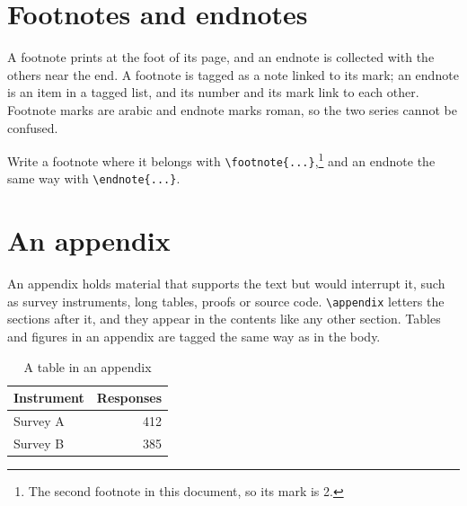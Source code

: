 \documentclass[12pt]{article}
\begin{document}
\section{Footnotes and endnotes}
A footnote prints at the foot of its page, and an endnote is collected with
the others near the end. A footnote is tagged as a note linked to its mark; an
endnote is an item in a tagged list, and its number and its mark link to each
other. Footnote marks are arabic and endnote marks roman, so the two series
cannot be confused.

Write a footnote where it belongs with \verb|\footnote{...}|,\footnote{The
second footnote in this document, so its mark is 2.} and an endnote the same
way with \verb|\endnote{...}|.

\appendix
\section{An appendix}
\label{app:example}
An appendix holds material that supports the text but would interrupt it, such
as survey instruments, long tables, proofs or source code. \verb|\appendix|
letters the sections after it, and they appear in the contents like any other
section. Tables and figures in an appendix are tagged the same way as in the
body.

\begin{table}\centering
  \caption{A table in an appendix}
  \begin{tabular}{lr}
    \toprule Instrument & Responses \\ \midrule
    Survey A & 412 \\
    Survey B & 385 \\ \bottomrule
  \end{tabular}
\end{table}
\end{document}
